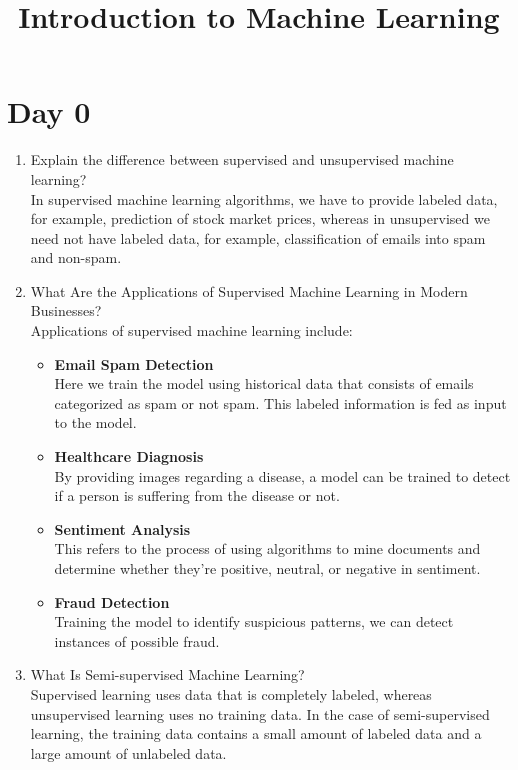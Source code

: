\documentclass[11pt]{article}
\title{Introduction to Machine Learning}
\date{}
\begin{document}
\maketitle
\section{Day 0}
\begin{enumerate}
\item Explain the difference between supervised and unsupervised machine
learning?\\[.5em]
In supervised machine learning algorithms, we have to provide labeled data, for example,
prediction of stock market prices, whereas in unsupervised we need not have labeled data, for example, classification of emails into spam and non-spam.

\item What Are the Applications of Supervised Machine Learning in Modern
Businesses?\\[.5em]
Applications of supervised machine learning include:
\begin{itemize}
\item \textbf{Email Spam Detection}\\
Here we train the model using historical data that consists of emails categorized as
spam or not spam. This labeled information is fed as input to the model.
\item \textbf{Healthcare Diagnosis}\\
By providing images regarding a disease, a model can be trained to detect if a person is
suffering from the disease or not.
\item \textbf{Sentiment Analysis}\\
This refers to the process of using algorithms to mine documents and determine
whether they’re positive, neutral, or negative in sentiment.
\item \textbf{Fraud Detection}\\
Training the model to identify suspicious patterns, we can detect instances of possible
fraud.
\end{itemize}

\item What Is Semi-supervised Machine Learning?\\[.5em]
Supervised learning uses data that is completely labeled, whereas unsupervised learning uses no training data. In the case of semi-supervised learning, the training data contains a small amount of labeled data and a large amount of unlabeled data.


\end{enumerate}
\end{document}
